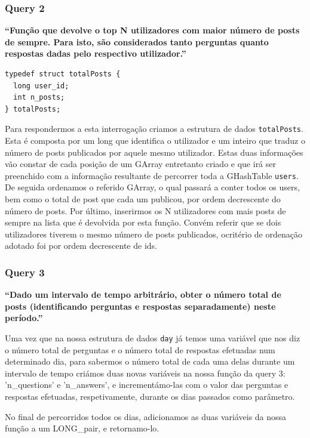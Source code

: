 \documentclass[a4paper]{article}
\begin{document}
\subsubsection*{Query 2}
\label{sec:query2}

\textbf{“Função que devolve o top N utilizadores com maior número
de posts de sempre. Para isto, são considerados tanto perguntas
quanto respostas dadas pelo respectivo utilizador.”}

\begin{verbatim}
typedef struct totalPosts {
  long user_id;
  int n_posts;
} totalPosts;
\end{verbatim}

Para respondermos a esta interrogação criamos a estrutura de dados
\texttt{totalPosts}. Esta é composta por um long que identifica o utilizador e um inteiro
que traduz o número de posts publicados por aquele mesmo utilizador.
Estas duas informações vão constar de cada posição de um GArray entretanto criado
e que irá ser preenchido com a informação resultante de percorrer
toda a GHashTable \texttt{users}.
De seguida ordenamos o referido GArray, o qual passará a conter todos os users,
bem como o total de post que cada um publicou, por ordem decrescente do número de posts.
Por último, inserirmos os N utilizadores com
mais posts de sempre na lista que é devolvida por esta função.
Convém referir que se dois utilizadores tiverem o mesmo número de posts publicados,
ocritério de ordenação adotado foi por ordem decrescente de ids.

\subsubsection*{Query 3}
\label{sec:query3}

\textbf{“Dado um intervalo de tempo arbitrário,
obter o número total de posts (identificando perguntas e respostas separadamente) neste período.”}

Uma vez que na nossa estrutura de dados \texttt{day} já temos uma variável que nos diz o número total de perguntas
e o número total de respostas efetuadas num determinado dia, para sabermos o
número total de cada uma delas durante um intervalo de tempo criámos duas novas
variáveis na nossa função da query 3: \textsf{'n\_questions'} e \textsf{'n\_answers'},
e incrementámo-las com o valor das perguntas e respostas efetuadas, respetivamente,
durante os dias passados como parâmetro.

No final de percorridos todos os dias, adicionamos as duas variáveis da nossa função a um LONG\_pair, e retornamo-lo.
\end{document}
